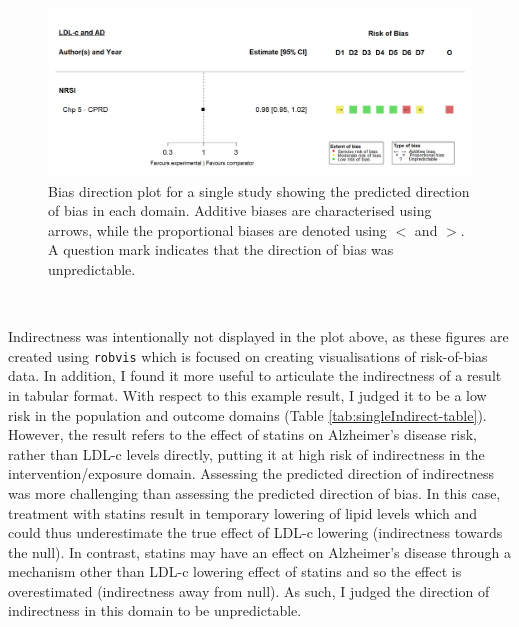 \documentclass[a4paper, twoside]{templates/ociamthesis}
\begin{document}
~\\




\begin{figure}[H]
\includegraphics[width=1\linewidth]{figures/tri/midlife_AD_single} \caption[Bias direction plot for a single study]{Bias direction plot for a single study showing the predicted direction of bias in each domain. Additive biases are characterised using arrows, while the proportional biases are denoted using \(<\) and \(>\). A question mark indicates that the direction of bias was unpredictable.}\label{fig:biasDirectionSingle}
\end{figure}

~

Indirectness was intentionally not displayed in the plot above, as these figures are created using \texttt{robvis} which is focused on creating visualisations of risk-of-bias data. In addition, I found it more useful to articulate the indirectness of a result in tabular format. With respect to this example result, I judged it to be a low risk in the population and outcome domains (Table \ref{tab:singleIndirect-table}). However, the result refers to the effect of statins on Alzheimer's disease risk, rather than LDL-c levels directly, putting it at high risk of indirectness in the intervention/exposure domain. Assessing the predicted direction of indirectness was more challenging than assessing the predicted direction of bias. In this case, treatment with statins result in temporary lowering of lipid levels which and could thus underestimate the true effect of LDL-c lowering (indirectness towards the null). In contrast, statins may have an effect on Alzheimer's disease through a mechanism other than LDL-c lowering effect of statins and so the effect is overestimated (indirectness away from null). As such, I judged the direction of indirectness in this domain to be unpredictable.

~\\
\end{document}
